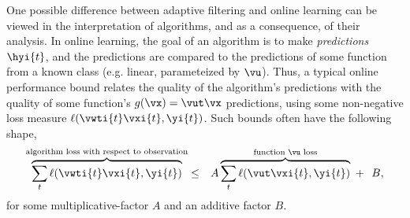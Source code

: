 One possible difference between adaptive filtering and online learning
can be viewed in the interpretation of algorithms, and as a
consequence, of their analysis. In online learning, the goal of an
algorithm is to make {\em predictions} $\hyi{t}$, and the predictions are
compared to the predictions of some function from a
known class (e.g. linear, parameteized
by $\vu$). Thus, a typical online performance bound relates the quality of the
algorithm's predictions with the quality of some function's $g(\vx)=\vut\vx$
predictions, using some non-negative loss measure $\ell(\vwti{t}\vxi{t},\yi{t})$. Such
bounds often have the following shape,
\begin{align*}
\overbrace{\sum_t \ell(\vwti{t}\vxi{t},\yi{t})}^{\textrm{algorithm
    loss with respect to observation}} &\leq&
A \overbrace{\sum_t \ell( \vut\vxi{t}, \yi{t})}^{\textrm{function $\vu$ loss}} ~+~~ B,
\end{align*}
for some multiplicative-factor $A$ and an additive factor $B$.

